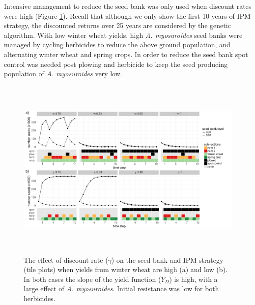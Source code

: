 \documentclass[12pt, a4paper]{article}
\begin{document}
Intensive management to reduce the seed bank was only used when discount rates were high (Figure \ref{fig:dis_rate}). Recall that although we only show the first 10 years of IPM strategy, the discounted returns over 25 years are considered by the genetic algorithm. With low winter wheat yields, high \textit{A. myosuroides} seed banks were managed by cycling herbicides to reduce the above ground population, and alternating winter wheat and spring crops. In order to reduce the seed bank spot control was needed post plowing and herbicide to keep the seed producing population of \textit{A. myosuroides} very low.
\begin{figure}[!ht]
	\includegraphics[height=90mm]{MS_figs/dis_rate_SB_strat.pdf}
	\caption{The effect of discount rate ($\gamma$) on the seed bank and IPM strategy (tile plots) when yields from winter wheat are high (a) and low (b). In both cases the slope of the yield function ($Y_D$) is high, with a large effect of \textit{A. myosuroides}. Initial resistance was low for both herbicides.}
	\label{fig:dis_rate} 
\end{figure}
\end{document}
